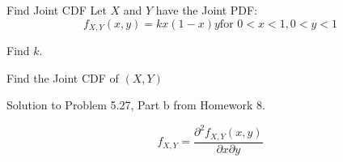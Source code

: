                         \begin{example}[Problem 5.27]{Find Joint CDF}
                          Let $X$ and $Y$ have the Joint PDF:
                          \begin{equation*}
                            f_{X,Y} \left( x,y \right) = k x \left( 1-x \right) y \text{for } 0<x<1, 0<y<1
                          \end{equation*}

                          \begin{boldalphlist}
                          \item Find $k$.
                          \item Find the Joint CDF of $\left( X,Y \right)$
                          \end{boldalphlist}

                          \tcblower

                          Solution to Problem 5.27, Part b from Homework 8.
                        \end{example}
			\begin{propertylist}[resume]
				\item
					\begin{equation}
						f_{X,Y} = \frac{\partial^{2} f_{X,Y} \left( x,y \right)}{\partial x \partial y}
					\end{equation}
			\end{propertylist}

